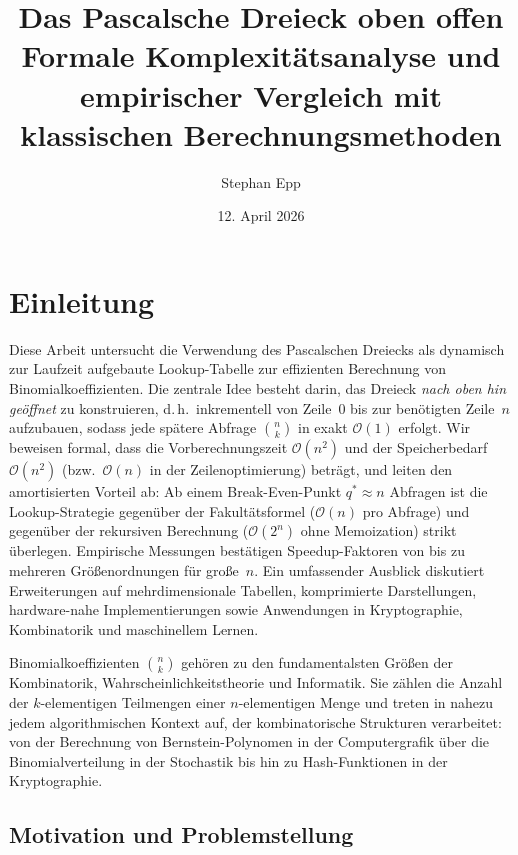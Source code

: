 ﻿\documentclass[12pt, a4paper]{article}
\title{\textbf{Das Pascalsche Dreieck oben offen}\\
	Formale Komplexitätsanalyse und empirischer Vergleich mit klassischen Berechnungsmethoden}
\author{Stephan Epp}
\date{12. April 2026}
\newcommand{\Oh}{\mathcal{O}}
\theoremstyle{plain}
\theoremstyle{definition}
\theoremstyle{remark}
\renewcommand{\Oh}{\mathcal{O}}
\begin{document}
\maketitle
\tableofcontents
\newpage

\section{Einleitung}
\label{sec:einleitung}
Diese Arbeit untersucht die Verwendung des Pascalschen Dreiecks als
dynamisch zur Laufzeit aufgebaute Lookup-Tabelle zur effizienten
Berechnung von Binomialkoeffizienten. Die zentrale Idee besteht darin,
das Dreieck \emph{nach oben hin geöffnet} zu konstruieren, d.\,h.\
inkrementell von Zeile~0 bis zur benötigten Zeile~$n$ aufzubauen,
sodass jede spätere Abfrage $\binom{n}{k}$ in exakt $\Oh(1)$ erfolgt.
Wir beweisen formal, dass die Vorberechnungszeit $\Oh(n^2)$ und der
Speicherbedarf $\Oh(n^2)$ (bzw.\ $\Oh(n)$ in der Zeilenoptimierung)
beträgt, und leiten den amortisierten Vorteil ab: Ab einem
Break-Even-Punkt $q^* \approx n$ Abfragen ist die Lookup-Strategie
gegenüber der Fakultätsformel ($\Oh(n)$ pro Abfrage) und gegenüber
der rekursiven Berechnung ($\Oh(2^n)$ ohne Memoization) strikt
überlegen. Empirische Messungen bestätigen Speedup-Faktoren von bis
zu mehreren Größenordnungen für große~$n$. Ein umfassender Ausblick
diskutiert Erweiterungen auf mehrdimensionale Tabellen, komprimierte
Darstellungen, hardware-nahe Implementierungen sowie Anwendungen in
Kryptographie, Kombinatorik und maschinellem Lernen.

Binomialkoeffizienten $\binom{n}{k}$ gehören zu den fundamentalsten
Größen der Kombinatorik, Wahrscheinlichkeitstheorie und Informatik.
Sie zählen die Anzahl der $k$-elementigen Teilmengen einer $n$-elementigen
Menge und treten in nahezu jedem algorithmischen Kontext auf, der
kombinatorische Strukturen verarbeitet: von der Berechnung von
Bernstein-Polynomen in der Computergrafik über die Binomialverteilung
in der Stochastik bis hin zu Hash-Funktionen in der Kryptographie.

\subsection{Motivation und Problemstellung}
\end{document}
